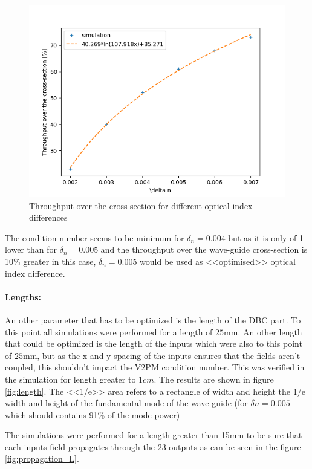 \begin{figure}[htbp]
  \centering
  \includegraphics[scale=.5]{picture/geometry/throughput_dn.png}
  \caption{Throughput over the cross section for different optical
    index differences}
  \label{fig:throu_dn}
\end{figure}

The condition number seems to be minimum for $\delta_n=0.004$ but as it
is only of 1 lower than for $\delta_n=0.005$ and the throughput over
the wave-guide cross-section is 10\% greater in this case, $\delta_n=0.005$ would be used as
<<optimised>> optical index difference.

\paragraph{Lengths:}
An other parameter that has to be optimized is the length of the
DBC part. To this point all simulations were performed for a length
of $25\si{\milli\meter}$. An other length that could be optimized is
the length of the inputs which were also to this point of
$25\si{\milli\meter}$, but as the x and y spacing of the inputs ensures
that the fields aren't coupled, this shouldn't impact the V2PM
condition number. This was verified in the simulation for length
greater to $1cm$.
The results are shown in figure \ref{fig:length}. The <<1/e>> area
refers to a rectangle of width and height the 1/e width and height of
the fundamental mode of the wave-guide (for $\delta n=0.005$ which should contains 91\% of
the mode power)

The simulations were performed for a length greater than 15mm to be
sure that each inputs field propagates through the 23 outputs as can
be seen in the figure \ref{fig:propagation_L}.

